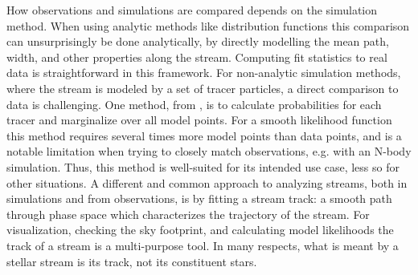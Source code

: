 \documentclass[fleqn,usenatbib]{mnras}
\begin{document}
  How observations and simulations are compared depends on the simulation
  method. When using analytic methods like distribution functions
  \citep{Bovy2014} this comparison can unsurprisingly be done analytically, by
  directly modelling the mean path, width, and other properties along the
  stream. Computing fit statistics to real data is straightforward in this
  framework. For non-analytic simulation methods, where the stream is modeled by
  a set of tracer particles, a direct comparison to data is challenging. One
  method, from \citet{Bonaca2014}, is to calculate probabilities for each tracer
  and marginalize over all model points. For a smooth likelihood function this
  method requires several times more model points than data points, and is a
  notable limitation when trying to closely match observations, e.g. with an
  N-body simulation. Thus, this method is well-suited for its intended use case,
  less so for other situations. A different and common approach to analyzing
  streams, both in simulations and from observations, is by fitting a stream
  track: a smooth path through phase space which characterizes the trajectory of
  the stream. For visualization, checking the sky footprint, and calculating
  model likelihoods the track of a stream is a multi-purpose tool. In many
  respects, what is meant by a stellar stream is its track, not its constituent
  stars.
  
\end{document}
